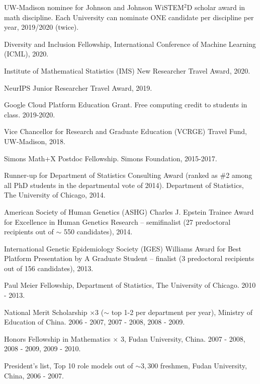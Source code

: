 \documentclass[letterpaper]{article}
\renewenvironment{itemize}{
  \begin{list}{}{
    \setlength{\leftmargin}{1.5em}
  }
}{
  \end{list}
}
\begin{document}
\begin{itemize}
\item UW-Madison nominee for Johnson and Johnson WiSTEM$^2$D scholar award in math discipline. Each University can nominate ONE candidate per discipline per year, 2019/2020 (twice). 
\item Diversity and Inclusion Fellowship, International Conference of Machine Learning (ICML), 2020.
\item Institute of Mathematical Statistics (IMS) New Researcher Travel Award, 2020.
\item NeurIPS Junior Researcher Travel Award, 2019.
\item Google Cloud Platform Education Grant. Free computing credit to students in class. 2019-2020. 
\item Vice Chancellor for Research and Graduate Education (VCRGE) Travel Fund, UW-Madison, 2018. 
\item  Simons Math+X Postdoc Fellowship. Simons Foundation, 2015-2017. 
\item Runner-up for Department of Statistics Consulting Award (ranked as \#2 among all PhD students in the departmental vote of 2014). Department of Statistics, The University of Chicago, 2014. 
\item American Society of Human Genetics (ASHG) Charles J. Epstein Trainee Award for Excellence in Human Genetics Research -- semifinalist (27 predoctoral recipients out of $\sim$ 550 candidates), 2014. 
\item International Genetic Epidemiology Society (IGES) Williams Award for Best Platform Presentation by A Graduate Student -- finalist (3 predoctoral recipients out of 156 candidates), 2013. 
\item  Paul Meier Fellowship, Department of Statistics, The University of Chicago. 2010 - 2013.
\item National Merit Scholarship $\times$3 ($\sim$ top 1-2 per department per year), Ministry of Education of China. 2006 - 2007, 2007 - 2008, 2008 - 2009.
\item Honors Fellowship in Mathematics $\times$ 3, Fudan University, China. 2007 - 2008, 2008 - 2009, 2009 - 2010.
\item President's list, Top 10 role models out of $\sim 3,300$ freshmen, Fudan University, China, 2006 - 2007. 
\end{itemize}
\end{document}
